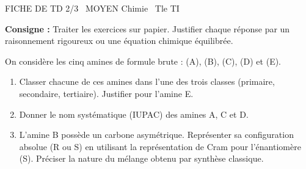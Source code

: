 \documentclass[11pt]{article}
\begin{document}
\begin{tcolorbox}[enhanced,colback=popink,colframe=popink,arc=10pt,boxrule=0pt,left=12pt,right=12pt,top=9pt,bottom=9pt]
{\color{white}\popxbold\small FICHE DE TD 2/3 \textbullet\ MOYEN \hfill Chimie \textbullet\ Tle TI\par}
\end{tcolorbox}
\vspace{4pt}
\textbf{Consigne :} Traiter les exercices sur papier. Justifier chaque réponse par un raisonnement rigoureux ou une équation chimique équilibrée.

\begin{exercice}
On considère les cinq amines de formule brute  :  (A),  (B),  (C),  (D) et  (E).
\begin{enumerate}
    \item Classer chacune de ces amines dans l'une des trois classes (primaire, secondaire, tertiaire). Justifier pour l'amine E.
    \item Donner le nom systématique (IUPAC) des amines A, C et D.
    \item L'amine B possède un carbone asymétrique. Représenter sa configuration absolue (R ou S) en utilisant la représentation de Cram pour l'énantiomère (S). Préciser la nature du mélange obtenu par synthèse classique.
\end{enumerate}
\end{exercice}
\end{document}
